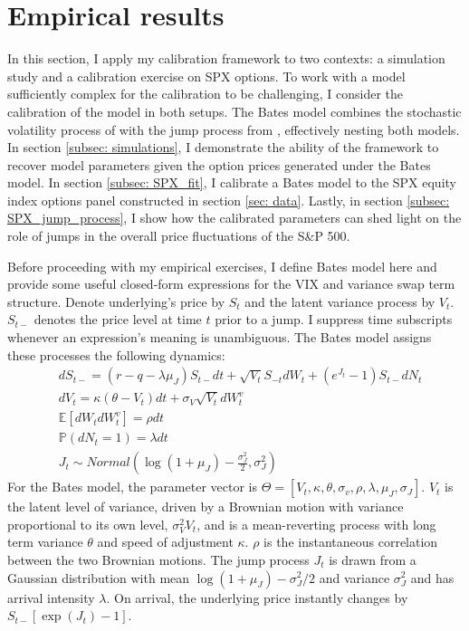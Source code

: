 \documentclass[12pt]{article}
\begin{document}
\section{Empirical results}\label{sec: emp_results}
In this section, I apply my calibration framework to two contexts: a simulation study and a calibration exercise on SPX options. To work with a model sufficiently complex for the calibration to be challenging, I consider the calibration of the \cite{bates1996jumps} model in both setups. The Bates model combines the stochastic volatility process of \cite{heston1993closed} with the jump process from \cite{merton1976option}, effectively nesting both models. In section \ref{subsec: simulations}, I demonstrate the ability of the framework to recover model parameters given the option prices generated under the Bates model. In section \ref{subsec: SPX_fit}, I calibrate a Bates model to the SPX equity index options panel constructed in section \ref{sec: data}. Lastly, in section \ref{subsec: SPX_jump_process}, I show how the calibrated parameters can shed light on the role of jumps in the overall price fluctuations of the S\&P 500.

Before proceeding with my empirical exercises, I define Bates model here and provide some useful closed-form expressions for the VIX and variance swap term structure. Denote underlying's price by $S_t$ and the latent variance process by $V_t$. $S_{t-}$ denotes the price level at time $t$ prior to a jump. I suppress time subscripts whenever an expression's meaning is unambiguous. The Bates model assigns these processes the following dynamics:
\begin{equation}
\begin{aligned}
& d S_{t-}=\left(r-q-\lambda \mu_J\right) S_{t-} d t+\sqrt{V_t} S_{-t} d W_t+(e^{J_t}-1) S_{t-} d N_t \\
& d V_t=\kappa\left(\theta-V_t\right) d t+\sigma_V \sqrt{V_t} d W_t^v \\
& \mathbb{E}\left[d W_t  d W_t^v\right]= \rho d t \\
& \mathbb{P}\left(d N_t=1\right)=\lambda d t\\
& J_t \sim Normal\left(\log \left(1+\mu_J\right)-\frac{\sigma_J^2}{2}, \sigma_J^2 \right)
\end{aligned}
\end{equation}
For the Bates model, the parameter vector is $\Theta = [V_t, \kappa, \theta, \sigma_v, \rho, \lambda, \mu_J, \sigma_J]$. $V_t$ is the latent level of variance, driven by a Brownian motion with variance proportional to its own level, $\sigma_V^2 V_t$, and is a mean-reverting process with long term variance $\theta$ and speed of adjustment $\kappa$. $\rho$ is the instantaneous correlation between the two Brownian motions. The jump process $J_t$ is drawn from a Gaussian distribution with mean $\log(1+\mu_J) - \sigma^2_J/2$ and variance $\sigma_J^2$ and has arrival intensity $\lambda$. On arrival, the underlying price instantly changes by $S_{t-}[\exp(J_t) - 1]$.
\end{document}
